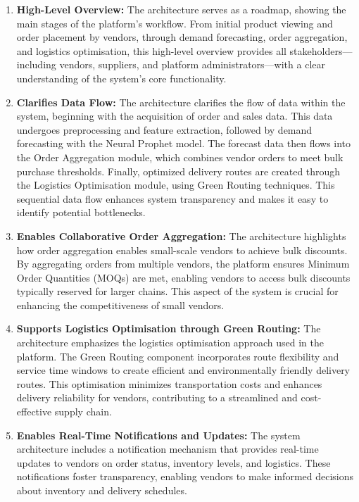 \begin{enumerate}
    \item \textbf{High-Level Overview:} The architecture serves as a roadmap, showing the main stages of the platform’s workflow. From initial product viewing and order placement by vendors, through demand forecasting, order aggregation, and logistics optimisation, this high-level overview provides all stakeholders—including vendors, suppliers, and platform administrators—with a clear understanding of the system’s core functionality.

    \item \textbf{Clarifies Data Flow:} The architecture clarifies the flow of data within the system, beginning with the acquisition of order and sales data. This data undergoes preprocessing and feature extraction, followed by demand forecasting with the Neural Prophet model. The forecast data then flows into the Order Aggregation module, which combines vendor orders to meet bulk purchase thresholds. Finally, optimized delivery routes are created through the Logistics Optimisation module, using Green Routing techniques. This sequential data flow enhances system transparency and makes it easy to identify potential bottlenecks.

    \item \textbf{Enables Collaborative Order Aggregation:} The architecture highlights how order aggregation enables small-scale vendors to achieve bulk discounts. By aggregating orders from multiple vendors, the platform ensures Minimum Order Quantities (MOQs) are met, enabling vendors to access bulk discounts typically reserved for larger chains. This aspect of the system is crucial for enhancing the competitiveness of small vendors.

    \item \textbf{Supports Logistics Optimisation through Green Routing:} The architecture emphasizes the logistics optimisation approach used in the platform. The Green Routing component incorporates route flexibility and service time windows to create efficient and environmentally friendly delivery routes. This optimisation minimizes transportation costs and enhances delivery reliability for vendors, contributing to a streamlined and cost-effective supply chain.

    \item \textbf{Enables Real-Time Notifications and Updates:} The system architecture includes a notification mechanism that provides real-time updates to vendors on order status, inventory levels, and logistics. These notifications foster transparency, enabling vendors to make informed decisions about inventory and delivery schedules.


\end{enumerate}
